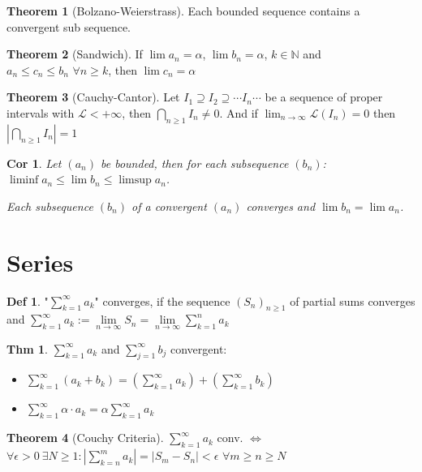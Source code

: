 \documentclass[a4paper, 10pt]{article}
\newtheorem*{corollary}{Cor}
\theoremstyle{definition}
\newtheorem*{theorem}{Thm}
\newtheorem*{definition}{Def}
\theoremstyle{ex}
\theoremstyle{named}
\newtheorem*{ntheorem_wrapper}{Theorem}
\newenvironment{ntheorem}%
    {\begin{mdframed}[style=important]\begin{ntheorem_wrapper}}%
    {\end{ntheorem_wrapper}\end{mdframed}}
\newcommand{\N}{\mathbb{N}}
\begin{document}
\begin{ntheorem}[Bolzano-Weierstrass]
    Each bounded sequence contains a convergent sub sequence.
\end{ntheorem}

\begin{ntheorem}[Sandwich]
    If $\lim a_n = \alpha$, $\lim b_n = \alpha$, $k \in \N$ and \\
    $a_n \leq c_n \leq b_n$ $\forall n \geq k$, then $\lim c_n = \alpha$
\end{ntheorem}

\begin{ntheorem}[Cauchy-Cantor]
    Let $I_1 \supseteq I_2 \supseteq \cdots I_n \cdots$ be a sequence of proper intervals with $\mathcal{L} < + \infty$, then $\bigcap_{n\geq1} I_n \neq 0$. And if $\lim_{n \to \infty} \mathcal{L}(I_n) = 0$ then $|\bigcap_{n\geq1} I_n| = 1$
\end{ntheorem}

\begin{corollary}
    Let $(a_n)$ be bounded, then for each subsequence $(b_n)$: $\liminf a_n \leq \lim b_n \leq \limsup a_n$.

    Each subsequence $(b_n)$ of a convergent $(a_n)$ converges and $\lim b_n = \lim a_n$.
\end{corollary}

\section{Series}
\begin{definition}
    "$\sum_{k=1}^\infty a_k$" converges, if the sequence $(S_n)_{n \geq 1}$ of partial sums converges and $\sum\limits_{k=1}^\infty a_k := \lim\limits_{n \to \infty} S_n = \lim\limits_{n \to \infty} \sum\limits_{k=1}^n a_k$
\end{definition}

\begin{theorem}
    $\sum_{k = 1}^\infty a_k$ and $\sum_{j = 1}^\infty b_j$ convergent:
    \begin{itemize}
        \item $\sum_{k = 1}^\infty (a_k + b_k) = (\sum_{k = 1}^\infty a_k) + (\sum_{k = 1}^\infty b_k)$
        \item $\sum_{k = 1}^\infty \alpha \cdot a_k = \alpha \sum_{k = 1}^\infty a_k$
    \end{itemize}
\end{theorem}

\begin{ntheorem}[Couchy Criteria]
    $\sum_{k = 1}^\infty a_k$ conv. $\iff$ $\forall \epsilon > 0 \ \exists N \geq 1 : |\sum_{k = n}^m a_k| = |S_m - S_n| < \epsilon$ $\forall m\geq n \geq N$
\end{ntheorem}
\end{document}

